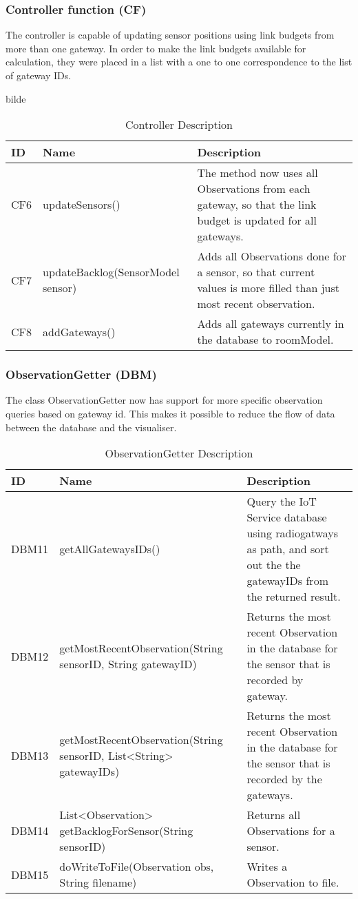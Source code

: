 \documentclass[../document]{subfiles}
\begin{document}
\subsubsection{Controller function (CF)}
The controller is capable of updating sensor positions using link budgets from more than one gateway. In order to make the link budgets available for calculation, they were placed in a list with a one to one correspondence to the list of gateway IDs.

bilde

\begin{table}[H]
\caption{Controller Description}
\centering
\begin{tabularx}{\textwidth}{|l|l|X|}
\hline ID
&Name
&Description
\\ \hline CF6
&updateSensors()
&The method now uses all Observations from each gateway, so that the link budget is updated for all gateways.
\\ \hline CF7 
&updateBacklog(SensorModel sensor)
&Adds all Observations done for a sensor, so that current values is more filled than just most recent observation.
\\ \hline CF8
&addGateways()
&Adds all gateways currently in the database to roomModel.
\\ \hline 
\end{tabularx}
\end{table}

\subsubsection{ObservationGetter (DBM)}
The class ObservationGetter now has support for more specific observation queries based on gateway id. This makes it possible to reduce the flow of data between the database and the visualiser.

\begin{table}[H]
\caption{ObservationGetter Description}
\centering
\begin{tabularx}{\textwidth}{|l|X|X|}
\hline 
ID
&Name
&Description
\\ \hline DBM11
&getAllGatewaysIDs()
&Query the IoT Service database using radiogatways as path, and sort out the the gatewayIDs from the returned result.
\\ \hline DBM12
&getMostRecentObservation(String sensorID, String gatewayID)
&Returns the most recent Observation in the database for the sensor that is recorded by gateway.
\\ \hline DBM13
&getMostRecentObservation(String sensorID, List<String> gatewayIDs)
&Returns the most recent Observation in the database for the sensor that is recorded by the gateways.
\\ \hline DBM14
&List<Observation> getBacklogForSensor(String sensorID)
&Returns all Observations for a sensor.
\\ \hline DBM15
&doWriteToFile(Observation obs, String filename)
&Writes a Observation to file.
\\ \hline 
\end{tabularx}
\end{table}
\end{document}
